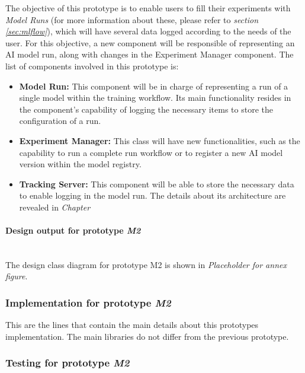 The objective of this prototype is to enable users to fill their experiments with \emph{Model Runs} (for more information about these, please refer to
\emph{section \ref{sec:mlflow}}), which will have several data logged according to the needs of the user. For this objective, a new component will be responsible 
of representing an \acrshort{AI} model run, along with changes in the Experiment Manager component. The list of components involved in this prototype is:

\begin{itemize}
    \item \textbf{Model Run:} This component will be in charge of representing a run of a single model within the training workflow. Its main functionality
    resides in the component's capability of logging the necessary items to store the configuration of a run.

    \item \textbf{Experiment Manager: }This class will have new functionalities, such as the capability to run a complete run workflow or to register a new \acrshort{AI} 
    model version within the model registry.

    \item \textbf{Tracking Server: }This component will be able to store the necessary data to enable logging in the model run. The details about its architecture are revealed in \emph{Chapter }
\end{itemize}

\paragraph{Design output for prototype \emph{M2}}\mbox{}\\

The design class diagram for prototype M2 is shown in \emph{Placeholder for annex figure}.

\subsubsection{Implementation for prototype \emph{M2}}

This are the lines that contain the main details about this prototypes implementation. The main libraries do not differ from
the previous prototype.

\subsubsection{Testing for prototype \emph{M2}}

